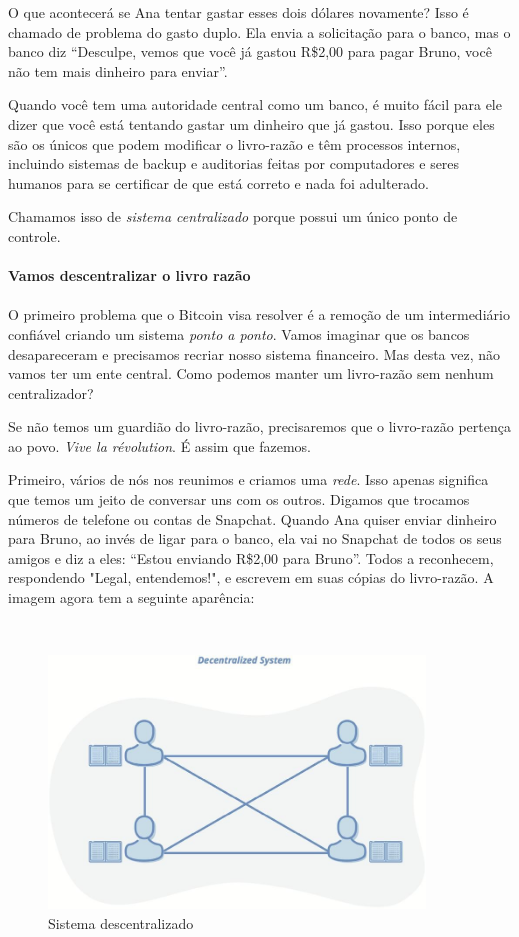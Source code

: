 O que acontecerá se Ana tentar gastar esses dois dólares novamente? Isso é chamado de problema do gasto duplo. Ela envia a solicitação para o banco, mas o banco diz “Desculpe, vemos que você já gastou R\$2,00 para pagar Bruno, você não tem mais dinheiro para enviar”.

Quando você tem uma autoridade central como um banco, é muito fácil para ele dizer que você está tentando gastar um dinheiro que já gastou. Isso porque eles são os únicos que podem modificar o livro-razão e têm processos internos, incluindo sistemas de backup e auditorias feitas por computadores e seres humanos para se certificar de que está correto e nada foi adulterado.

Chamamos isso de \textit{sistema centralizado} porque possui um único ponto de controle.

\paragraph{Vamos descentralizar o livro razão}
\paragraph{}

O primeiro problema que o Bitcoin visa resolver é a remoção de um intermediário confiável criando um sistema \textit{ponto a ponto}. Vamos imaginar que os bancos desapareceram e precisamos recriar nosso sistema financeiro. Mas desta vez, não vamos ter um ente central. Como podemos manter um livro-razão sem nenhum centralizador?

Se não temos um guardião do livro-razão, precisaremos que o livro-razão pertença ao povo. \textit{Vive la révolution}. É assim que fazemos.

Primeiro, vários de nós nos reunimos e criamos uma \textit{rede}. Isso apenas significa que temos um jeito de conversar uns com os outros. Digamos que trocamos números de telefone ou contas de Snapchat. Quando Ana quiser enviar dinheiro para Bruno, ao invés de ligar para o banco, ela vai no Snapchat de todos os seus amigos e diz a eles: “Estou enviando R\$2,00 para Bruno”. Todos a reconhecem, respondendo "Legal, entendemos!", e escrevem em suas cópias do livro-razão. A imagem agora tem a seguinte aparência:

~

\begin{figure}
  \centering
  \includegraphics[width=10cm]{imagens/descentralizado-capitulo-02.jpg}
  \caption{Sistema descentralizado}
\end{figure}
\newpage


